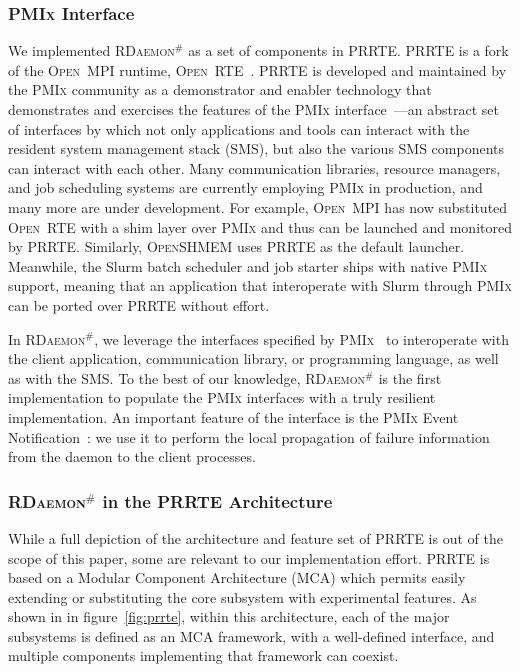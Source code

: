 \documentclass[5p,times,twocolumn]{elsarticle}
\newcommand{\prrte}[0]{\textsc{PRRTE}\xspace}
\newcommand{\pmix}[0]{\textsc{PMIx}\xspace}
\newcommand{\orte}[0]{\textsc{Open~RTE}\xspace}
\newcommand{\ompi}[0]{\textsc{Open~MPI}\xspace}
\newcommand{\oshmem}[0]{\textsc{OpenSHMEM}\xspace}
\newcommand{\ourwork}[0]{\textsc{RDaemon}\ensuremath{^\#}\xspace}
\begin{document}
\subsubsection{\pmix Interface}
We implemented \ourwork as a set of components in \prrte. \prrte is a fork of the \ompi runtime, \orte~\cite{Castain05}. \prrte is developed and maintained
by the \pmix community as a demonstrator and enabler technology that demonstrates
and exercises the features of the \pmix interface~\cite{CASTAIN18}---an abstract set of interfaces by which not only applications and tools can interact with the resident system management stack (SMS), but also the various SMS components can interact with each other.
Many communication libraries, resource managers, and job scheduling systems are currently employing \pmix in production, and many more are under development.
For example, \ompi has now substituted \orte with a shim layer over \pmix and thus can be launched and monitored by \prrte.
Similarly, \oshmem uses \prrte as the default launcher.
Meanwhile, the Slurm batch scheduler and job starter ships with native \pmix support, meaning that an application that interoperate with Slurm through \pmix can be ported  over \prrte without effort.

In \ourwork, we leverage the interfaces specified by \pmix~\cite{Ralph15} to interoperate
with the client application, communication library, or programming language, as well as with the
SMS.
To the best of our knowledge, \ourwork is the first
implementation to populate the \pmix interfaces with a truly resilient implementation.
An important feature of the interface is the \pmix Event Notification~\cite{Ralph002}:
we use it to perform the local propagation of failure information from the
daemon to the client processes.

\subsubsection{\ourwork in the \prrte Architecture}

While a full depiction of the architecture and feature set of \prrte is out of the scope of this paper, some are relevant to our implementation effort.
\prrte is based on a Modular Component Architecture (MCA) which permits easily extending or substituting the core subsystem with experimental features.
As shown in in figure~\ref{fig:prrte}, within this architecture, each of the major subsystems is defined as an MCA framework, with a well-defined interface, and multiple components implementing that framework can coexist.
\end{document}
